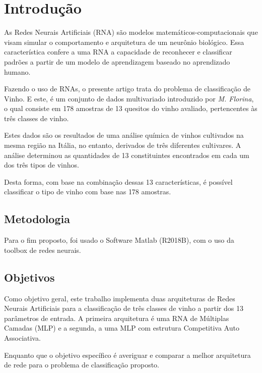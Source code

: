 
\section{Introdução} \label{introducao}

As Redes Neurais Artificiais (RNA) são modelos matemáticos-computacionais que visam simular o comportamento e arquitetura de um neurônio biológico. Essa característica confere a uma RNA a capacidade de reconhecer e classificar padrões a partir de um modelo de aprendizagem baseado no aprendizado humano.

Fazendo o uso de RNAs, o presente artigo trata do problema de classificação de Vinho. E este, é um conjunto de dados multivariado introduzido por \textit{M. Florina}, o qual consiste em 178 amostras de 13 quesitos do vinho avaliado, pertencentes às três classes de vinho.

Estes dados são os resultados de uma análise química de vinhos cultivados na mesma região na Itália, no entanto, derivados de três diferentes cultivares. A análise determinou as quantidades de 13 constituintes encontrados em cada um dos três tipos de vinhos.

Desta forma, com base na combinação dessas 13 características, é possível classificar o tipo de vinho com base nas 178 amostras.

\subsection{Metodologia}

Para o fim proposto, foi usado o Software Matlab (R2018B), com o uso da toolbox de redes neurais.


\subsection{Objetivos}

Como objetivo geral, este trabalho implementa duas arquiteturas de Redes Neurais Artificiais para a classificação de três classes de vinho a partir dos 13 parâmetros de entrada. A primeira arquitetura é uma RNA de Múltiplas Camadas (MLP) e a segunda, a uma MLP com estrutura Competitiva Auto Associativa.

Enquanto que o objetivo específico é averiguar e comparar a melhor arquitetura de rede para o problema de classificação proposto.


